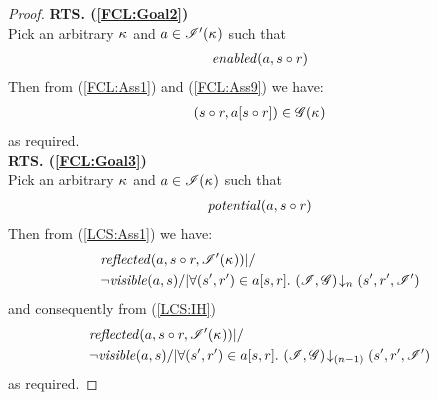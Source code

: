 \begin{lemma}[]
\begin{proof}

\noindent\textbf{RTS. (\ref{FCL:Goal2})}\\
Pick an arbitrary $\kappa_{}$ and $a \in \mathscr{I}'(\kappa_{})$ such that 
\begin{align}
	\mathit{enabled}(a, s \circ r) \label{FCL:Ass9}
\end{align}
%
Then from (\ref{FCL:Ass1}) and (\ref{FCL:Ass9}) we have:
%
\begin{align}
	(s \circ r, a[s \circ r]) \in \mathscr{G}(\kappa_{}) \nonumber
\end{align}
% 
as required.\\
%
%
%

\noindent\textbf{RTS. (\ref{FCL:Goal3})}\\
Pick an arbitrary $\kappa_{}$ and $a \in \mathscr{I}(\kappa_{})$ such that 
\begin{align}
	\mathit{potential}(a, s \circ r) \label{FCL:Ass12}
\end{align}
Then from (\ref{LCS:Ass1}) we have: 
%
\begin{align*}
  & \mathit{reflected}(a, s \circ r,\mathscr{I}'(\kappa_{})) |/ \\
  & \neg\mathit{visible}(a, s) /| \forall (s', r') \in a[s, r].\, \left(\mathscr{I}, \mathscr{G}\right) \!\downarrow_{n} \left(s', r', \mathscr{I}'\right)  
\end{align*}
%
and consequently from (\ref{LCS:IH})
%
\begin{align*}
  &\mathit{reflected}(a, s \circ r, \mathscr{I}'(\kappa_{})) |/\\
  & \neg\mathit{visible}(a, s) /| \forall (s', r') \in a[s, r].\, \left(\mathscr{I}, \mathscr{G}\right) \!\downarrow_{(n-1)} \left(s', r', \mathscr{I}'\right)  
\end{align*}
%
as required.

\end{proof}
\end{lemma}
%
%

